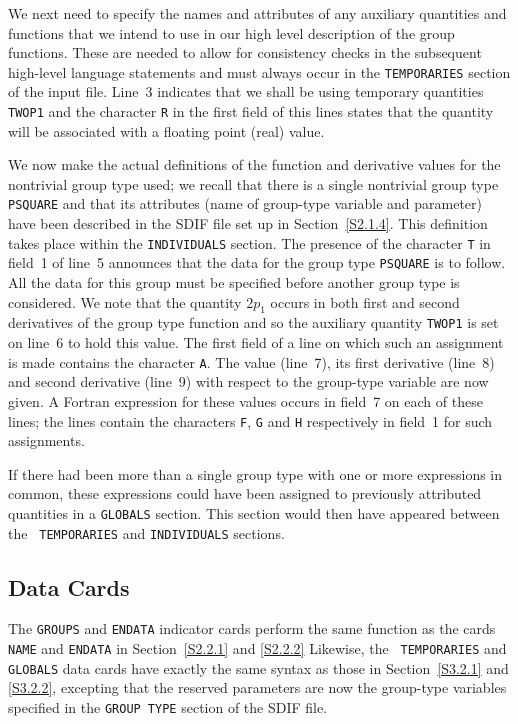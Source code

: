 \documentclass[a4paper]{article}
\begin{document}
We  next need to specify the   names and  attributes of  any auxiliary
quantities  and functions that  we intend  to use   in  our high level
description  of the group  functions.
These are  needed to   allow for consistency checks
in the subsequent high-level  language statements
and must always occur  in the {\tt  TEMPORARIES}
section of the input  file.  Line~3 indicates  that we shall  be using
temporary quantities {\tt TWOP1} and the character {\tt R}
in the first field  of this lines  states  that the  quantity  will be
associated with a floating point (real) value.

We now make the actual definitions of the function and derivative
values for the nontrivial  group type
used; we recall  that there is a
single nontrivial group type   {\tt  PSQUARE} and that its  attributes
(name of group-type variable
and parameter) have been  described in the
SDIF file set up in Section~\ref{S2.1.4}.  This definition takes place
within the {\tt INDIVIDUALS}
section.  The presence of the character {\tt T}
in field~1  of line~5 announces  that the data for the  group
type {\tt PSQUARE} is to follow. All  the  data for this group must be
specified before another group type
is considered.   We note  that the
quantity $2 p_1$ occurs  in both  first  and second derivatives
of the
group type function  and so the  auxiliary quantity {\tt TWOP1} is set
on line~6 to hold this value.  The first field of a line on which such
an assignment  is  made  contains the character   {\tt A}.
The  value  (line~7),   its  first  derivative  (line~8)    and second
derivative (line~9) with  respect to  the group-type
variable are now given.  A Fortran
expression for  these values  occurs in field~7 on
each of these lines; the lines contain the  characters {\tt F}, {\tt G}
and {\tt H}
respectively in field~1 for such assignments.

If there had  been more than  a single group  type
with  one or  more expressions  in common, these  expressions
could have been assigned to
previously   attributed quantities in  a {\tt   GLOBALS}
section.  This  section   would then  have  appeared between the  {\tt
TEMPORARIES}
and {\tt INDIVIDUALS}
sections.

\subsection{\label{S4.2} Data Cards}

The {\tt  GROUPS}
and {\tt  ENDATA}
indicator  cards
perform the  same
function  as   the cards    {\tt   NAME}
 and  {\tt      ENDATA}
in     Section~\ref{S2.2.1}  and   \ref{S2.2.2}   Likewise,  the  {\tt
TEMPORARIES}
and {\tt GLOBALS}
data cards
have exactly the same syntax
as those in  Section~\ref{S3.2.1} and \ref{S3.2.2}, excepting that the
reserved parameters are now the group-type
variables specified in the
{\tt GROUP TYPE}
section of the SDIF file.
\end{document}
